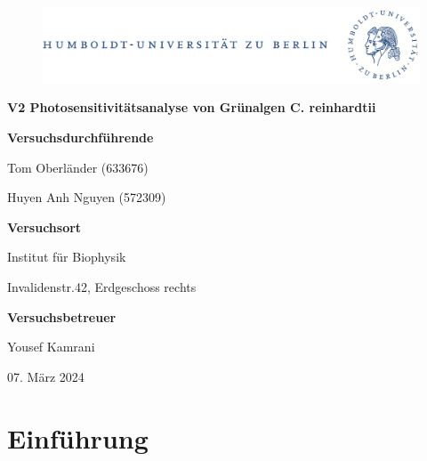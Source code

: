 \documentclass[10pt,a4paper]{article}
\begin{document}
	
	\begin{titlepage}
		\begin{center}
			\begin{figure}[h!tbp]
				\includegraphics[width=\linewidth]{HUlogo.PNG}
			\end{figure}
			\vspace*{0.5cm}
			
			\textcolor{Bluetitle}{\textbf{\huge V2 Photosensitivitätsanalyse von Grünalgen C. reinhardtii}}\par
			
			\vspace*{1.4cm}
			
			\textcolor{Greyish}{\textbf{Versuchsdurchführende}}\par
			\textcolor{Greyish}{Tom Oberländer (633676)}\par
			\textcolor{Greyish}{Huyen Anh Nguyen (572309)}\par
			\vspace*{0.5cm}
			\textcolor{Greyish}{\textbf{Versuchsort}}\par
			\textcolor{Greyish}{Institut für Biophysik}\par
			\textcolor{Greyish}{Invalidenstr.42, Erdgeschoss rechts}\par
			\vspace*{0.5cm}
			\textcolor{Greyish}{\textbf{Versuchsbetreuer}}\par
			\textcolor{Greyish}{Yousef Kamrani}\par
			
			\vspace*{1.5 cm}
			
			\textcolor{Greyish}{07. März 2024}\par
			
			\vspace*{1.5 cm}
			
			
		\end{center}
		
	\tableofcontents
			
	\end{titlepage}
	
	
	\section{Einführung}
	
\end{document}
